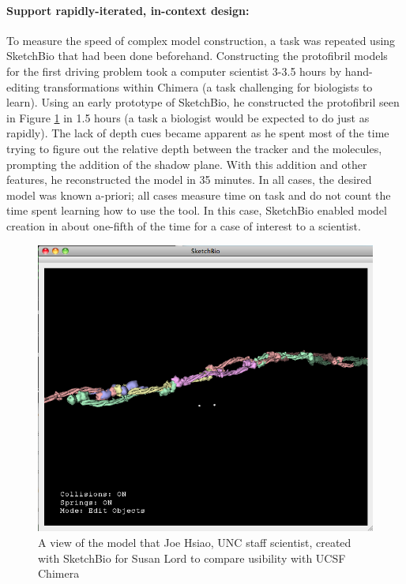 \documentclass[twocolumn]{bmcart}%
\begin{document}
\paragraph*{Support rapidly-iterated, in-context design:}
To measure the speed of complex model construction, a task was repeated using SketchBio that had been done beforehand.
Constructing the protofibril models for the first driving problem took a computer scientist 3-3.5 hours by hand-editing transformations within Chimera (a task challenging for biologists to learn).
Using an early prototype of SketchBio, he constructed the protofibril seen in Figure \ref{fig:joe_test} in 1.5 hours (a task a biologist would be expected to do just as rapidly).
The lack of depth cues became apparent as he spent most of the time trying to figure out the relative depth between the tracker and the molecules, prompting the addition of the shadow plane.
With this addition and other features, he reconstructed the model in 35 minutes.
In all cases, the desired model was known a-priori; all cases measure time on task and do not count the time spent learning how to use the tool.
In this case, SketchBio enabled model creation in about one-fifth of the time for a case of interest to a scientist.

\begin{figure}[h]
\centering
\includegraphics[width=0.9\columnwidth]{joe_test.png}
\caption{A view of the model that Joe Hsiao, UNC staff scientist, created with SketchBio for Susan Lord to compare usibility with UCSF Chimera}
\label{fig:joe_test}
\end{figure}
\end{document}
